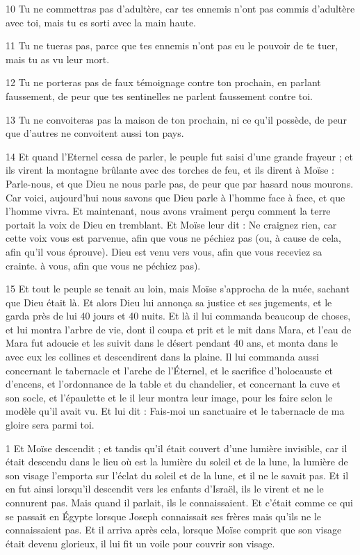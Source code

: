 \par 10 Tu ne commettras pas d'adultère, car tes ennemis n'ont pas commis d'adultère avec toi, mais tu es sorti avec la main haute.

\par 11 Tu ne tueras pas, parce que tes ennemis n'ont pas eu le pouvoir de te tuer, mais tu as vu leur mort.

\par 12 Tu ne porteras pas de faux témoignage contre ton prochain, en parlant faussement, de peur que tes sentinelles ne parlent faussement contre toi.

\par 13 Tu ne convoiteras pas la maison de ton prochain, ni ce qu'il possède, de peur que d'autres ne convoitent aussi ton pays.

\par 14 Et quand l'Eternel cessa de parler, le peuple fut saisi d'une grande frayeur ; et ils virent la montagne brûlante avec des torches de feu, et ils dirent à Moïse : Parle-nous, et que Dieu ne nous parle pas, de peur que par hasard nous mourons. Car voici, aujourd’hui nous savons que Dieu parle à l’homme face à face, et que l’homme vivra. Et maintenant, nous avons vraiment perçu comment la terre portait la voix de Dieu en tremblant. Et Moïse leur dit : Ne craignez rien, car cette voix vous est parvenue, afin que vous ne péchiez pas (ou, à cause de cela, afin qu'il vous éprouve). Dieu est venu vers vous, afin que vous receviez sa crainte. à vous, afin que vous ne péchiez pas).

\par 15 Et tout le peuple se tenait au loin, mais Moïse s'approcha de la nuée, sachant que Dieu était là. Et alors Dieu lui annonça sa justice et ses jugements, et le garda près de lui 40 jours et 40 nuits. Et là il lui commanda beaucoup de choses, et lui montra l'arbre de vie, dont il coupa et prit et le mit dans Mara, et l'eau de Mara fut adoucie et les suivit dans le désert pendant 40 ans, et monta dans le avec eux les collines et descendirent dans la plaine. Il lui commanda aussi concernant le tabernacle et l'arche de l'Éternel, et le sacrifice d'holocauste et d'encens, et l'ordonnance de la table et du chandelier, et concernant la cuve et son socle, et l'épaulette et le il leur montra leur image, pour les faire selon le modèle qu'il avait vu. Et lui dit : Fais-moi un sanctuaire et le tabernacle de ma gloire sera parmi toi.


\par 1 Et Moïse descendit ; et tandis qu'il était couvert d'une lumière invisible, car il était descendu dans le lieu où est la lumière du soleil et de la lune, la lumière de son visage l'emporta sur l'éclat du soleil et de la lune, et il ne le savait pas. Et il en fut ainsi lorsqu'il descendit vers les enfants d'Israël, ils le virent et ne le connurent pas. Mais quand il parlait, ils le connaissaient. Et c'était comme ce qui se passait en Égypte lorsque Joseph connaissait ses frères mais qu'ils ne le connaissaient pas. Et il arriva après cela, lorsque Moïse comprit que son visage était devenu glorieux, il lui fit un voile pour couvrir son visage.


